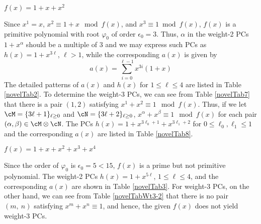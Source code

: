\begin{example}$f(x)=1+x+x^2$

Since $x^1=x$, $x^2 \equiv 1+x \mod f(x)$, and $x^3 \equiv 1 \bmod f(x)$, $f(x)$ is a primitive polynomial with root $\varphi_0$ of order $\epsilon_0=3$. Thus, $\alpha$ in the weight-2 PCs $1+x^\alpha$ should be a multiple of $3$ and we may express such PCs as $h(x)=1+x^{3\ell}$, $\ell>1$, while the corresponding $a(x)$ is given by 
\begin{equation*}
	a(x)=\sum_{i=0}^{\ell-1} x^{3i}(1+x)
\end{equation*}
The detailed patterns of $a(x)$ and $h(x)$ for $1 \leq \ell \leq 4$ are listed in Table \ref{novelTab2}.
To determine the weight-3 PCs, we can see from Table \ref{novelTab7} that there is a pair $(1,2)$ satisfying $x^1+x^2 \equiv 1 \mod f(x)$. Thus, if we let $\cM = \{3\ell+1\}_{\ell\geq 0}$ and $\cN = \{3\ell+2\}_{\ell\geq 0}$, 
$x^\alpha+x^\beta \equiv 1 \mod f(x)$ for each pair $(\alpha,\beta) \in \cM\otimes\cN$. The PCs $h(x)=1+x^{3\ell_0+1}+x^{3\ell_1+2}$ for $0 \leq \ell_0,\ell_1 \leq 1$ and the corresponding $a(x)$ are listed in Table \ref{novelTab8}.


\label{ex-1}
\end{example}




\begin{example}
$f(x)=1+x+x^2+x^3+x^4$

Since the order of $\varphi_0$ is $\epsilon_0=5< 15$, $f(x)$ is a prime but not primitive polynomial. The weight-2 PCs $h(x)=1+x^{5\ell}$, $1 \leq \ell \leq 4$, and the corresponding $a(x)$ are shown in Table \ref{novelTab3}. For weight-3 PCs, on the other hand, we can see from Table \ref{novelTabWt3-2} that there is no pair $(m,~n)$ satisfying $x^m+x^n \equiv 1$, and hence, the given $f(x)$ does not yield weight-3 PCs.




\label{ex-2}
\end{example}

